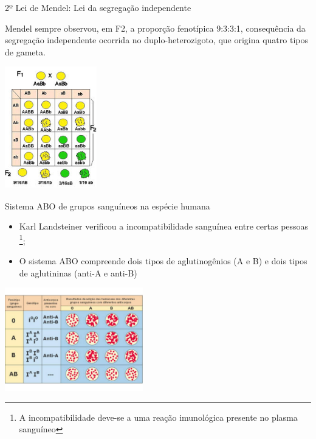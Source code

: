 \documentclass[]{beamer}
\begin{document}
  \begin{frame}{2º Lei de Mendel: Lei da segregação independente}
    \begin{center}
        Mendel sempre observou, em F2, a proporção fenotípica 9:3:3:1, consequência da segregação independente ocorrida no duplo-heterozigoto, que origina quatro tipos de gameta.

        \hspace{0.5cm}

        \includegraphics[width=4cm]{images/proporcao1-edited}
    \end{center}
  \end{frame}

  \begin{frame}{Sistema ABO de grupos sanguíneos na espécie humana}
    \begin{center}
      \begin{multicols}{2}
        \begin{itemize}
          \item Karl Landsteiner verificou a incompatibilidade sanguínea entre certas pessoas
            \footnote{
              A incompatibilidade deve-se a uma reação imunológica presente no plasma sanguíneo
            };
          \item O sistema ABO compreende dois tipos de aglutinogênios (A e B) e dois tipos de aglutininas (anti-A e anti-B)
        \end{itemize}

        \columnbreak
        \includegraphics[width=6cm]{images/abo.png}
      \end{multicols}
    \end{center}
  \end{frame}
\end{document}
